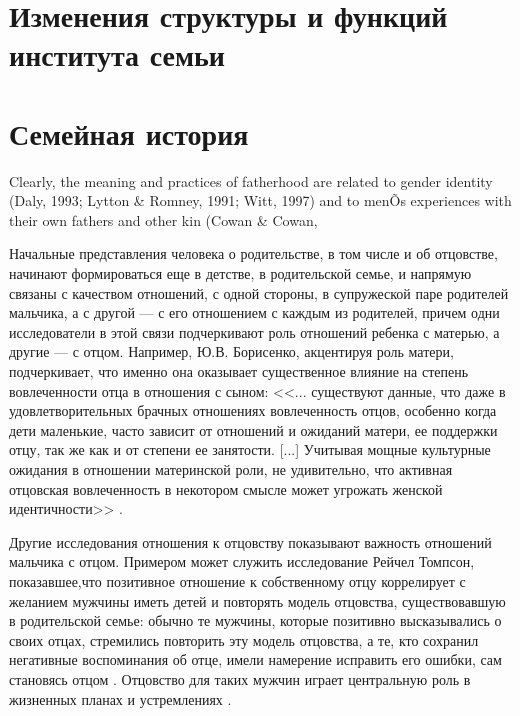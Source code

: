 \documentclass{../../common/thesisbyxetex}
\begin{document}
\section{Изменения структуры и функций института семьи}




\section{Семейная история}


Clearly, the meaning and practices of fatherhood
are related to gender identity (Daly, 1993; Lytton \&
Romney, 1991; Witt, 1997) and to menÕs experiences
with their own fathers and other kin (Cowan \& Cowan,
\cite[131]{f21}

Начальные представления человека о родительстве, в том числе и об отцовстве, начинают формироваться 
еще в детстве, в родительской семье, и напрямую связаны с качеством отношений, с одной стороны, в 
супружеской паре родителей мальчика, а с другой --- с его отношением с каждым из родителей, причем 
одни исследователи в этой связи подчеркивают роль отношений ребенка с матерью, а другие --- с 
отцом. Например, Ю.В. Борисенко, акцентируя роль матери, подчеркивает, что именно она оказывает 
существенное влияние на степень вовлеченности отца в отношения с сыном: <<... существуют 
данные, что даже в удовлетворительных брачных отношениях вовлеченность отцов, особенно когда дети 
маленькие, часто зависит от отношений и ожиданий матери, ее поддержки отцу, так же как и от степени 
ее занятости. [...]  Учитывая мощные культурные ожидания в отношении материнской роли, не 
удивительно, что активная отцовская вовлеченность в некотором смысле может угрожать женской 
идентичности>> \cite[115]{psyot}.

Другие исследования отношения к отцовству показывают важность отношений мальчика с 
отцом. Примером может служить исследование Рейчел Томпсон, показавшее,что позитивное отношение к 
собственному отцу коррелирует с желанием мужчины иметь детей и повторять модель отцовства, 
существовавшую в родительской семье: обычно те мужчины, которые позитивно высказывались о 
своих отцах, стремились повторить эту модель отцовства, а те, кто сохранил негативные 
воспоминания об отце, имели намерение исправить его ошибки, сам становясь отцом  \cite[161]{imaf}.  
Отцовство для таких мужчин играет центральную роль в жизненных 
планах и устремлениях \cite{imaf}. 
\end{document}
